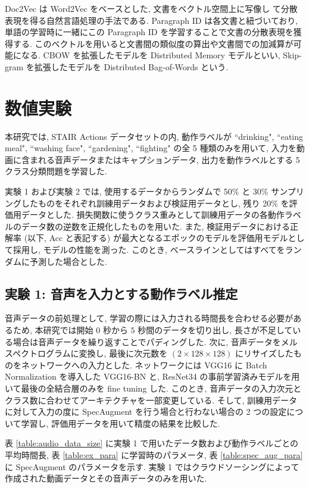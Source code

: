 \documentclass[twocolumn]{jarticle}     %
\begin{document}
Doc2Vec \cite{DBLP:journals/corr/LeM14} は Word2Vec をベースとした, 文書をベクトル空間上に写像し
て分散表現を得る自然言語処理の手法である.
Paragraph ID は各文書と紐づいており, 単語の学習時に一緒にこの Paragraph ID を学習することで文書の分散表現を獲得する.
このベクトルを用いると文書間の類似度の算出や文書間での加減算が可能になる.
CBOW を拡張したモデルを Distributed Memory モデルといい, Skip-gram を拡張したモデルを Distributed Bag-of-Words という.

\section{数値実験}
本研究では, STAIR Actions データセットの内, 動作ラベルが
``drinking", ``eating meal", ``washing face", ``gardening", ``fighting" の全 5 種類のみを用いて, 入力を動画に含まれる音声データまたはキャプションデータ, 出力を動作ラベルとする 5 クラス分類問題を学習した.

実験 1 および実験 2 では, 使用するデータからランダムで 50\% と 30\% サンプリングしたものをそれぞれ訓練用データおよび検証用データとし, 残り 20\% を評価用データとした. 損失関数に使うクラス重みとして訓練用データの各動作ラベルのデータ数の逆数を正規化したものを用いた. また, 検証用データにおける正解率 (以下, Acc と表記する) が最大となるエポックのモデルを評価用モデルとして採用し, モデルの性能を測った. このとき, ベースラインとしてはすべてをランダムに予測した場合とした.

\subsection{\small{実験 1: 音声を入力とする動作ラベル推定}}
音声データの前処理として, 学習の際には入力される時間長を合わせる必要があるため, 本研究では開始 $0$ 秒から $5$ 秒間のデータを切り出し, 長さが不足している場合は音声データを繰り返すことでパディングした. 次に, 音声データをメルスペクトログラムに変換し, 最後に次元数を $(2 \times 128 \times 128)$ にリサイズしたものをネットワークへの入力とした. ネットワークには VGG16 に Batch Normalization を導入した VGG16-BN と, ResNet34 の事前学習済みモデルを用いて最後の全結合層のみを fine tuning した. このとき, 音声データの入力次元とクラス数に合わせてアーキテクチャを一部変更している.
そして, 訓練用データに対して入力の度に SpecAugment を行う場合と行わない場合の 2 つの設定について学習し, 評価用データを用いて精度の結果を比較した.

表 \ref{table:audio_data_size} に実験 1 で用いたデータ数および動作ラベルごとの平均時間長, 表 \ref{table:ex_para} に学習時のパラメータ, 表 \ref{table:spec_aug_para} に SpecAugment のパラメータを示す.
実験 1 ではクラウドソーシングによって作成された動画データとその音声データのみを用いた.
\end{document}
